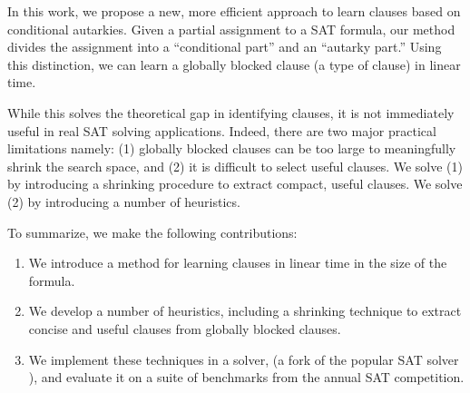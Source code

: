 In this work, we propose a new, more efficient approach to learn \pr clauses based on conditional autarkies. Given a partial assignment to a SAT formula, our method divides the assignment into a ``conditional part'' and an ``autarky part.'' Using this distinction, we can learn a globally blocked clause (a type of \pr clause) in linear time.

While this solves the theoretical gap in identifying \pr clauses, it is not immediately useful in real SAT solving applications. Indeed, there are two major practical limitations namely: (1) globally blocked clauses can be too large to meaningfully shrink the search space, and (2) it is difficult to select useful clauses. We solve (1) by introducing a shrinking procedure to extract compact, useful \pr clauses. We solve (2) by introducing a number of heuristics.



To summarize, we make the following contributions: 

\begin{enumerate} 
    \item We introduce a method for learning \pr clauses in linear time in the size of the formula. 
    \item We develop a number of heuristics, including a shrinking technique to extract concise and useful \pr clauses from globally blocked clauses. 
    \item We implement these techniques in a solver, \tool (a fork of the popular SAT solver \cadical), and evaluate it on a suite of benchmarks from the annual SAT competition.
\end{enumerate}